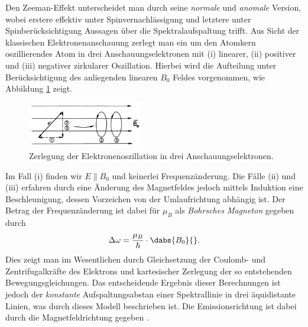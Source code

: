 Den Zeeman-Effekt unterscheidet man durch seine \emph{normale} und \emph{anomale} Version, wobei erstere effektiv unter Spinvernachlässigung und letztere unter Spinberücksichtigung Aussagen über die Spektralaufspaltung trifft. Aus Sicht der klassischen Elektronenanschauung zerlegt man ein um den Atomkern oszillierendes Atom in drei Anschauungselektronen mit (i) linearer, (ii) positiver und (iii) negativer zirkularer Oszillation. Hierbei wird die Aufteilung unter Berücksichtigung des anliegenden linearen $B_0$ Feldes vorgenommen, wie Abbildung \ref{fig:ElektronenOszillationZerlegung} zeigt. 
\begin{figure}[H]
	\centering
	\includegraphics[width=5cm]{Bilddateien/Grundlagen/ElektronOszillationZerlegung.png}
	\caption{Zerlegung der Elektronenoszillation in drei Anschauungselektronen.}
	\label{fig:ElektronenOszillationZerlegung}
\end{figure}
Im Fall (i) finden wir $E\parallel B_0$ und keinerlei Frequenzänderung. Die Fälle (ii) und (iii) erfahren durch eine Änderung des Magnetfeldes jedoch mittels Induktion eine Beschleunigung, dessen Vorzeichen von der Umlaufrichtung abhängig ist. Der Betrag der Frequenzänderung ist dabei für $\mu_B$ als \emph{Bohrsches Magneton} gegeben durch 
\[
	\Delta\omega = \frac{\mu_B}{\hbar}\cdot\dabs{B_0}{}.
\]
Dies zeigt man im Wesentlichen durch Gleichsetzung der Coulomb- und Zentrifugalkräfte des Elektrons und kartesischer Zerlegung der so entstehenden Bewegungsgleichungen. Das entscheidende Ergebnis dieser Berechnungen ist jedoch der \emph{konstante} Aufspaltungsabstan einer Spektrallinie in drei äquidistante Linien, was durch dieses Modell beschrieben ist. Die Emissionsrichtung ist dabei durch die Magnetfeldrichtung gegeben \cite[p.216ff]{HakenWolf}.

